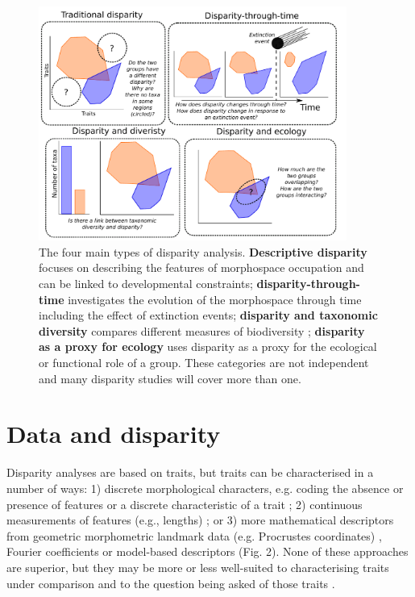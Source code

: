 \documentclass[12pt,letterpaper]{article}
\begin{document}
\begin{figure}[!htbp]
\centering
   \includegraphics[width=0.9\textwidth]{Figures/figure_disparities.pdf}
\caption{
    The four main types of disparity analysis. \textbf{Descriptive disparity} focuses on describing the features of morphospace occupation and can be linked to developmental constraints; \textbf{disparity-through-time} investigates the evolution of the morphospace through time including the effect of extinction events; \textbf{disparity and taxonomic diversity} compares different measures of biodiversity ; \textbf{disparity as a proxy for ecology} uses disparity as a proxy for the ecological or functional role of a group.
    These categories are not independent and many disparity studies will cover more than one.
}
\label{Fig:disparity}
\end{figure}



\section{Data and disparity} \label{section:data}

\noindent Disparity analyses are based on traits, but traits can be characterised in a number of ways:
	1) discrete morphological characters, e.g. coding the absence or presence of features or a discrete characteristic of a trait \citep[][e.g]{Foote1989-fd, Deline2018-le};
	2) continuous measurements of features (e.g., lengths) \citep[][e.g]{Anderson2001-qb}; or
	3) more mathematical descriptors from geometric morphometric landmark data (e.g. Procrustes coordinates) \citep[][e.g]{Cooney2017-ly}, Fourier coefficients \citep[][e.g]{Foote1995-do, Spriggs2018-nu} or model-based descriptors \citep{Raup1961-vx,Saunders2004} (Fig. 2).
None of these approaches are superior, but they may be more or less well-suited to characterising traits under comparison and to the question being asked of those traits \citep{hetherington2015cladistic,Hopkins2017-cf}.
\end{document}

